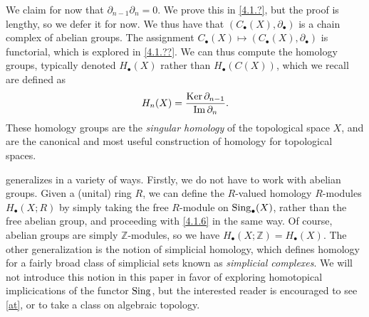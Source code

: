 \begin{construction}
	We claim for now that $\partial _{n-1} \partial _n=0$. We prove this in \cref{4.1.?}, but the proof is lengthy, so we defer it for now. We thus have that $(C_{\bullet} (X),\partial _{\bullet} )$ is a chain complex of abelian groups. The assignment $C_{\bullet} (X)\mapsto (C_{\bullet} (X),\partial _{\bullet} )$ is functorial, which is explored in \cref{4.1.??}. We can thus compute the homology groups, typically denoted $H_{\bullet} (X)$ rather than $H_{\bullet} (C(X))$, which we recall are defined as
	\[
		H_n(X)=\frac{\operatorname{Ker} \partial _{n-1} }{\operatorname{Im} \partial _n} 
	.\]
	These homology groups are the \emph{singular homology} of the topological space $X$, and are the canonical and most useful construction of homology for topological spaces.
\end{construction}


\begin{remark}\label{4.1.7}
	 generalizes in a variety of ways. Firstly, we do not have to work with abelian groups. Given a (unital) ring $R$, we can define the $R$-valued homology $R$-modules $H_{\bullet} (X;R)$ by simply taking the free $R$-module on $\operatorname{Sing}_{\bullet} (X)$, rather than the free abelian group, and proceeding with \cref{4.1.6} in the same way. Of course, abelian groups are simply $\mathbb{Z} $-modules, so we have $H_{\bullet} (X;\mathbb{Z} )=H_{\bullet} (X)$. The other generalization is the notion of simplicial homology, which defines homology for a fairly broad class of simplicial sets known as \emph{simplicial complexes}. We will not introduce this notion in this paper in favor of exploring homotopical implicications of the functor $\operatorname{Sing}$, but the interested reader is encouraged to see \cref{at}, or to take a class on algebraic topology.
\end{remark}



